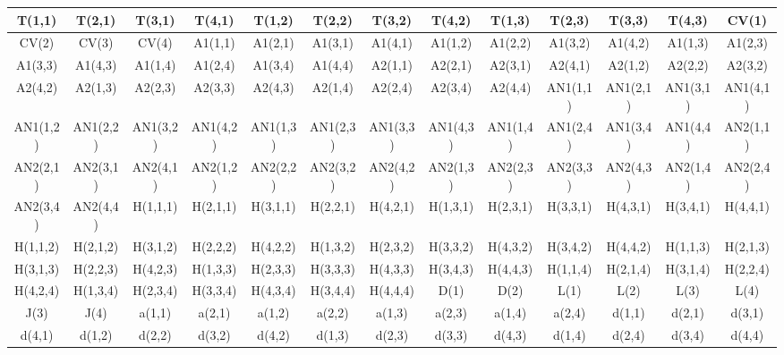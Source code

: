 \documentclass{article}
\begin{document}
\begin{center}
\begin{tabular}{|c|c|c|c|c|c|c|c|c|c|c|c|c|}
\hline
T(1,1) & T(2,1) & T(3,1) & T(4,1) & T(1,2) & T(2,2) & T(3,2) & T(4,2) & T(1,3) & T(2,3) & T(3,3) & T(4,3) & CV(1) \\
\hline
CV(2) & CV(3) & CV(4) & A{1}(1,1) & A{1}(2,1) & A{1}(3,1) & A{1}(4,1) & A{1}(1,2) & A{1}(2,2) & A{1}(3,2) & A{1}(4,2) & A{1}(1,3) & A{1}(2,3) \\
\hline
A{1}(3,3) & A{1}(4,3) & A{1}(1,4) & A{1}(2,4) & A{1}(3,4) & A{1}(4,4) & A{2}(1,1) & A{2}(2,1) & A{2}(3,1) & A{2}(4,1) & A{2}(1,2) & A{2}(2,2) & A{2}(3,2) \\
\hline
A{2}(4,2) & A{2}(1,3) & A{2}(2,3) & A{2}(3,3) & A{2}(4,3) & A{2}(1,4) & A{2}(2,4) & A{2}(3,4) & A{2}(4,4) & AN{1}(1,1) & AN{1}(2,1) & AN{1}(3,1) & AN{1}(4,1) \\
\hline
AN{1}(1,2) & AN{1}(2,2) & AN{1}(3,2) & AN{1}(4,2) & AN{1}(1,3) & AN{1}(2,3) & AN{1}(3,3) & AN{1}(4,3) & AN{1}(1,4) & AN{1}(2,4) & AN{1}(3,4) & AN{1}(4,4) & AN{2}(1,1) \\
\hline
AN{2}(2,1) & AN{2}(3,1) & AN{2}(4,1) & AN{2}(1,2) & AN{2}(2,2) & AN{2}(3,2) & AN{2}(4,2) & AN{2}(1,3) & AN{2}(2,3) & AN{2}(3,3) & AN{2}(4,3) & AN{2}(1,4) & AN{2}(2,4) \\
\hline
AN{2}(3,4) & AN{2}(4,4) & H(1,1,1) & H(2,1,1) & H(3,1,1) & H(2,2,1) & H(4,2,1) & H(1,3,1) & H(2,3,1) & H(3,3,1) & H(4,3,1) & H(3,4,1) & H(4,4,1) \\
\hline
H(1,1,2) & H(2,1,2) & H(3,1,2) & H(2,2,2) & H(4,2,2) & H(1,3,2) & H(2,3,2) & H(3,3,2) & H(4,3,2) & H(3,4,2) & H(4,4,2) & H(1,1,3) & H(2,1,3) \\
\hline
H(3,1,3) & H(2,2,3) & H(4,2,3) & H(1,3,3) & H(2,3,3) & H(3,3,3) & H(4,3,3) & H(3,4,3) & H(4,4,3) & H(1,1,4) & H(2,1,4) & H(3,1,4) & H(2,2,4) \\
\hline
H(4,2,4) & H(1,3,4) & H(2,3,4) & H(3,3,4) & H(4,3,4) & H(3,4,4) & H(4,4,4) & D(1) & D(2) & L(1) & L(2) & L(3) & L(4) \\
\hline
J(3) & J(4) & a(1,1) & a(2,1) & a(1,2) & a(2,2) & a(1,3) & a(2,3) & a(1,4) & a(2,4) & d(1,1) & d(2,1) & d(3,1) \\
\hline
d(4,1) & d(1,2) & d(2,2) & d(3,2) & d(4,2) & d(1,3) & d(2,3) & d(3,3) & d(4,3) & d(1,4) & d(2,4) & d(3,4) & d(4,4) \\
\hline
\end{tabular}
\end{center}
\end{document}
